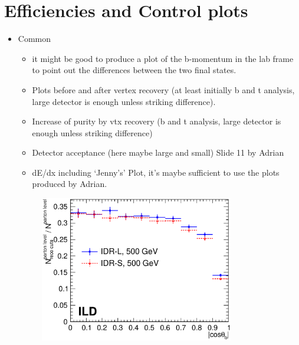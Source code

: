\documentclass[preprint]{elsarticle}
\begin{document}
\section{Efficiencies and Control plots }
\begin{itemize}

\item Common
\begin{itemize}
\item it might be good to produce a plot of the b-momentum in the lab frame to point out the differences between the two final states.\item Plots before and after vertex recovery (at least initially b and t analysis, large detector is enough unless striking difference).
\item Increase of purity by vtx recovery (b and t analysis, large detector is enough unless striking difference)
\item Detector acceptance (here maybe large and small) Slide 11 by Adrian
\item dE/dx including `Jenny's' Plot, it's maybe sufficient to use the plots produced by Adrian.
\end{itemize}

\begin{figure}[h!]
\centering
  \includegraphics[width=0.8\textwidth]{figures_BBbar/acceptance_2models_v2.eps} 
\caption{}
\label{fig_acceptance_bb}
\end{figure}


\end{itemize}
\end{document}
